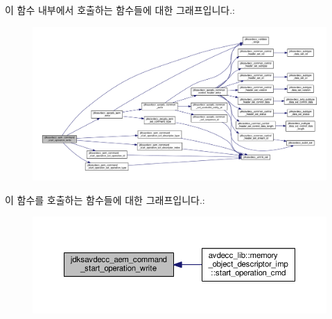 이 함수 내부에서 호출하는 함수들에 대한 그래프입니다.\+:
\nopagebreak
\begin{figure}[H]
\begin{center}
\leavevmode
\includegraphics[width=350pt]{group__command__start__operation_gaf0cf1d038dab08ae22452d1516ad876e_cgraph}
\end{center}
\end{figure}




이 함수를 호출하는 함수들에 대한 그래프입니다.\+:
\nopagebreak
\begin{figure}[H]
\begin{center}
\leavevmode
\includegraphics[width=350pt]{group__command__start__operation_gaf0cf1d038dab08ae22452d1516ad876e_icgraph}
\end{center}
\end{figure}


